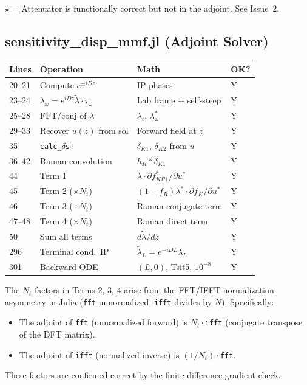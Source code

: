\documentclass[12pt,a4paper]{article}
\theoremstyle{definition}
\begin{document}
$\star$ = Attenuator is functionally correct but not in the adjoint. See Issue~2.

\subsection{sensitivity\_disp\_mmf.jl (Adjoint Solver)}

\begin{center}
\begin{tabular}{p{1.5cm}p{4.5cm}p{2.5cm}p{1cm}}
\toprule
\textbf{Lines} & \textbf{Operation} & \textbf{Math} & \textbf{OK?} \\
\midrule
20--21 & Compute $e^{\pm iDz}$ & IP phases & Y \\
23--24 & $\lambda_\omega = e^{iDz}\tilde\lambda \cdot \tau_\omega$ & Lab frame + self-steep & Y \\
25--28 & FFT/conj of $\lambda$ & $\lambda_t$, $\lambda^*_\omega$ & Y \\
29--33 & Recover $u(z)$ from sol & Forward field at $z$ & Y \\
35 & \texttt{calc\_$\delta$s!} & $\delta_{K1}$, $\delta_{K2}$ from $u$ & Y \\
36--42 & Raman convolution & $h_R * \delta_{K1}$ & Y \\
44 & Term 1 & $\lambda\cdot\partial f_{KR1}^*/\partial u^*$ & Y \\
45 & Term 2 ($\times N_t$) & $(1-f_R)\lambda^*\cdot\partial f_K/\partial u^*$ & Y \\
46 & Term 3 ($\div N_t$) & Raman conjugate term & Y \\
47--48 & Term 4 ($\times N_t$) & Raman direct term & Y \\
50 & Sum all terms & $d\tilde\lambda/dz$ & Y \\
296 & Terminal cond.\ IP & $\tilde\lambda_L = e^{-iDL}\lambda_L$ & Y \\
301 & Backward ODE & $(L, 0)$, Tsit5, $10^{-8}$ & Y \\
\bottomrule
\end{tabular}
\end{center}

The $N_t$ factors in Terms 2, 3, 4 arise from the FFT/IFFT normalization asymmetry in Julia (\texttt{fft} unnormalized, \texttt{ifft} divides by $N$). Specifically:
\begin{itemize}[leftmargin=*]
\item The adjoint of \texttt{fft} (unnormalized forward) is $N_t \cdot$\texttt{ifft} (conjugate transpose of the DFT matrix).
\item The adjoint of \texttt{ifft} (normalized inverse) is $(1/N_t)\cdot$\texttt{fft}.
\end{itemize}
These factors are confirmed correct by the finite-difference gradient check.
\end{document}
